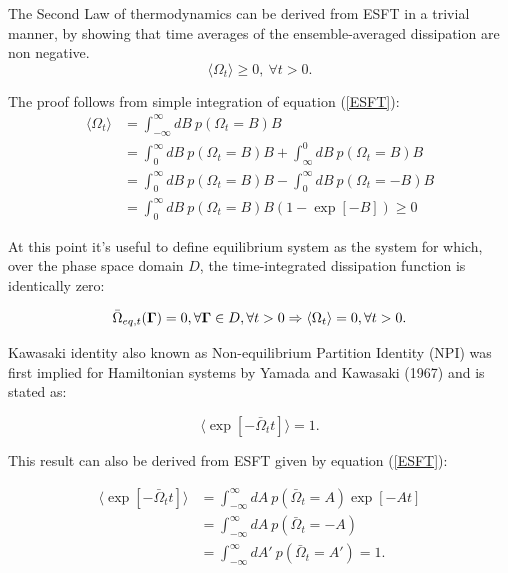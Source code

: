\documentclass[a4paper,12pt]{article}
\begin{document}
The Second Law of thermodynamics can be derived from ESFT in a trivial manner, by showing that time averages of the ensemble-averaged dissipation are non negative.
\begin{equation}
  \langle\Omega_t\rangle\geq 0,\  \forall t > 0.
\end{equation}

 The proof follows from simple integration of equation (\ref{ESFT}):
\begin{equation}
\begin{aligned}
  \langle \Omega_t \rangle &= \int_{-\infty}^{\infty} dB\ p(\Omega_t=B)B\\
  &=\int_0^{\infty} dB\ p(\Omega_t=B)B +\int_{\infty}^{0} dB\ p(\Omega_t=B)B \\
  &=\int_0^{\infty} dB\ p(\Omega_t=B)B -\int_{0}^{\infty} dB\ p(\Omega_t=-B)B \\
  &= \int_0^{\infty} dB\ p(\Omega_t=B)B(1-\exp[-B]) \geq 0 
\end{aligned}
\end{equation} 

At this point it's useful to define equilibrium system as the system for which, over the phase space domain $D$, the time-integrated dissipation function is identically zero:

\begin{equation}
  \bar{\Omega}_{eq,t}(\bm{\Gamma})=0, \forall\bm{\Gamma}\in  D, \forall t >0 \\
  \Rightarrow \langle \Omega_t \rangle = 0, \forall t > 0.
\end{equation}


Kawasaki identity also known as Non-equilibrium Partition Identity (NPI) was first implied for Hamiltonian systems by Yamada and Kawasaki (1967)\cite{Yamada:1967uo} and is stated as:

\begin{equation}
  \langle \exp[-\bar{\Omega}_t t] \rangle =1.
\end{equation}

This result can also be derived from ESFT given by equation (\ref{ESFT}):

\begin{equation}
\begin{aligned}
  \langle \exp[-\bar{\Omega}_t t] \rangle &= \int_{-\infty}^{\infty} dA\ p(\bar{\Omega}_t=A)\exp[-A t]\\
  &=\int_{-\infty}^{\infty} dA\ p(\bar{\Omega}_t=-A)\\
  &=\int_{-\infty}^{\infty} dA'\ p(\bar{\Omega}_t=A')=1.
\end{aligned}
\end{equation}
\end{document}
